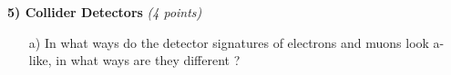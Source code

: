 {\vspace{4.in}

%
%
%

%

%


\textbf{5) Collider Detectors  } \hfill \textit{(4 points)}\\
\begin{itemize}
\item[a)]{ In what ways do the detector signatures of electrons and muons look a-like, in what ways are they different ?
}
\vspace*{1.5in}


\end{itemize}}
